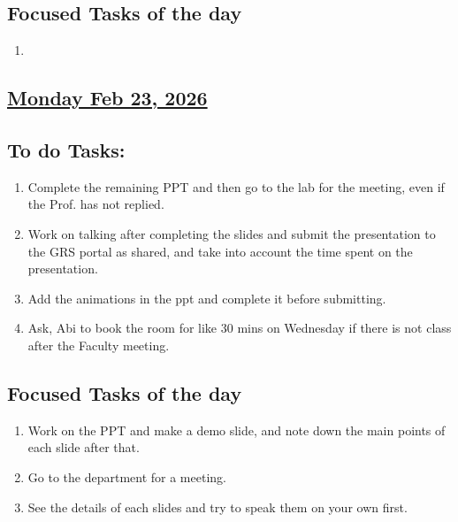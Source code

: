\subsection*{Focused Tasks of the day}
\begin{enumerate}[\ding{212}]  %
    \item 
\end{enumerate}
\subsection*{\underline{Monday Feb 23, 2026}}
\subsection*{To do Tasks:}
\begin{enumerate}
    \item Complete the remaining PPT and then go to the lab for the meeting, even if the Prof. has not replied. \cmark
    \item Work on talking after completing the slides and submit the presentation to the GRS portal as shared, and take into account the time spent on the presentation.
    \item Add the animations in the ppt and complete it before submitting.
    \item Ask, Abi to book the room for like 30 mins on Wednesday if there is not class after the Faculty meeting.
\end{enumerate}
\subsection*{Focused Tasks of the day}
\begin{enumerate}[\ding{212}]  %
    \item Work on the PPT and make a demo slide, and note down the main points of each slide after that.
    \item Go to the department for a meeting. \cmark
    \item See the details of each slides and try to speak them on your own first.
\end{enumerate}
